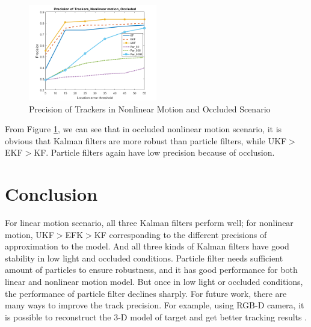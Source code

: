 \documentclass[10pt,twocolumn,letterpaper]{article}
\begin{document}
\begin{figure}[h]
     \centering
       \includegraphics[width=0.5\textwidth]{Nonlinear_Occluded.png}
        \caption{\small{Precision of Trackers in Nonlinear Motion and Occluded Scenario}}
        \label{fig: nonlinear occ}
 \end{figure}

From Figure \ref{fig: nonlinear occ}, we can see that in occluded nonlinear motion scenario, it is obvious that Kalman filters are more robust than particle filters, while UKF$>$EKF$>$KF. Particle filters again have low precision because of occlusion.

\section{Conclusion}

For linear motion scenario, all three Kalman filters perform well; for nonlinear motion, UKF$>$EFK$>$KF corresponding to the different precisions of approximation to the model. And all three kinds of Kalman filters have good stability in low light and occluded conditions. Particle filter needs sufficient amount of particles to ensure robustness, and it has good performance for both linear and nonlinear motion model. But once in low light or occluded conditions, the performance of particle filter declines sharply. For future work, there are many ways to improve the track precision. For example, using RGB-D camera, it is possible to reconstruct the 3-D model of target and get better tracking results \cite{ref:takimoto20163d}.



\end{document}

